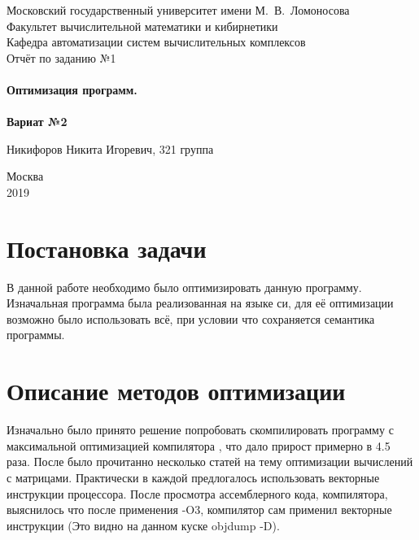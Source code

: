 \documentclass[a4peper, 12pt, titlepage, finall]{extreport}
\begin{document}
    \begin{titlepage}
        \begin{center}
            {\small \sc Московский государственный университет имени М.~В.~Ломоносова\\
            Факультет вычислительной математики и кибирнетики\\
            Кафедра автоматизации систем вычислительных комплексов\\}
            \vfill
            {\large \sc Отчёт по заданию №1}\\~\\

            {\large \bf Оптимизация программ.}\\~\\

            {\large \bf Вариат №2}
        \end{center}
        
        \begin{flushright}
            \vfill
            {Никифоров Никита Игоревич, 321 группа}
        \end{flushright}

        \begin{center}
            \vfill
            {\small Москва\\2019}
        \end{center}
    \end{titlepage}

    \tableofcontents
    \newpage

    \section{Постановка задачи}
        В данной работе необходимо было оптимизировать данную программу. Изначальная программа была реализованная на языке си, для её оптимизации возможно было использовать всё, при условии что сохраняется семантика программы.

    \newpage
    \section{Описание методов оптимизации}
        Изначально было принято решение попробовать скомпилировать программу с максимальной оптимизацией компилятора {}, что дало прирост примерно в 4.5 раза. 
        После было прочитанно несколько статей на тему оптимизации вычислений с матрицами. 
        Практически в каждой предлогалось использовать векторные инструкции процессора. 
        После просмотра ассемблерного кода, компилятора, выяснилось что после применения {\ttfamily -O3}, компилятор сам применил векторные инструкции (Это видно на данном куске {\ttfamily objdump -D}). \\
\end{document}
